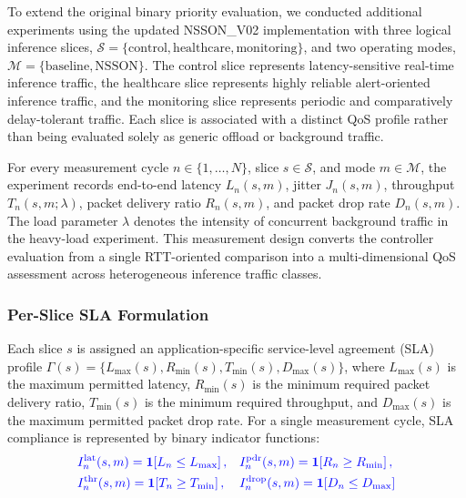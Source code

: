 \documentclass[journal]{IEEEtran}
\newcommand{\revblue}[1]{\textcolor{revblue}{#1}}
\begin{document}
\revblue{To extend the original binary priority evaluation, we conducted
additional experiments using the updated NSSON\_V02 implementation with
three logical inference slices,
$\mathcal{S}=\{\mathrm{control},\mathrm{healthcare},\mathrm{monitoring}\}$,
and two operating modes,
$\mathcal{M}=\{\mathrm{baseline},\mathrm{NSSON}\}$. The control slice
represents latency-sensitive real-time inference traffic, the healthcare slice represents highly reliable alert-oriented inference traffic, and the monitoring slice represents periodic and comparatively delay-tolerant
traffic. Each slice is associated with a distinct QoS profile rather than
being evaluated solely as generic offload or background traffic.}

\revblue{For every measurement cycle $n\in\{1,\ldots,N\}$, slice
$s\in\mathcal{S}$, and mode $m\in\mathcal{M}$, the experiment records
end-to-end latency $L_n(s,m)$, jitter $J_n(s,m)$, throughput
$T_n(s,m;\lambda)$, packet delivery ratio $R_n(s,m)$, and packet drop
rate $D_n(s,m)$. The load parameter $\lambda$ denotes the intensity of
concurrent background traffic in the heavy-load experiment. This
measurement design converts the controller evaluation from a single
RTT-oriented comparison into a multi-dimensional QoS assessment across
heterogeneous inference traffic classes.}

\subsubsection{\revblue{Per-Slice SLA Formulation}}

\revblue{Each slice $s$ is assigned an application-specific service-level
agreement (SLA) profile
$\Gamma(s)=\{L_{\max}(s),R_{\min}(s),T_{\min}(s),D_{\max}(s)\}$,
where $L_{\max}(s)$ is the maximum permitted latency,
$R_{\min}(s)$ is the minimum required packet delivery ratio,
$T_{\min}(s)$ is the minimum required throughput, and
$D_{\max}(s)$ is the maximum permitted packet drop rate. For a single
measurement cycle, SLA compliance is represented by binary indicator
functions:}
\begin{equation}
\color{blue}
\begin{aligned}
&I^{\mathrm{lat}}_n(s,m)= \mathbf{1}\!\left[L_n\leq L_{\max}\right], 
&&I^{\mathrm{pdr}}_n(s,m)= \mathbf{1}\!\left[R_n\geq R_{\min}\right], \\
&I^{\mathrm{thr}}_n(s,m)= \mathbf{1}\!\left[T_n\geq T_{\min}\right], 
&&I^{\mathrm{drop}}_n(s,m)= \mathbf{1}\!\left[D_n\leq D_{\max}\right]
\end{aligned}
\label{eq:multislice_sla_indicators}
\end{equation}
\end{document}
